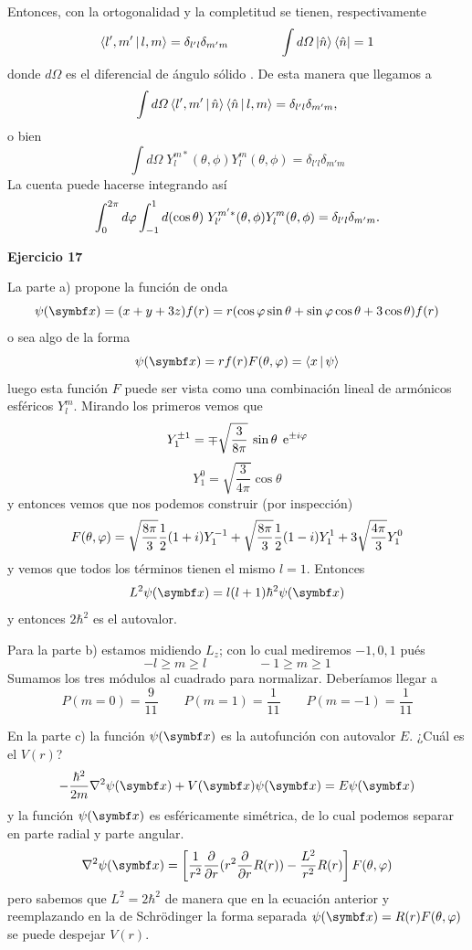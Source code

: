 \documentclass[10pt,oneside]{CBFT_book}
\begin{document}
Entonces, con la ortogonalidad y la completitud se tienen, respectivamente 
\[
	\Braket{l',m'|l,m} = \delta_{l'l} \delta_{m'm}
	\qquad \qquad 
	\int d\Omega \Ket{\hat{n}}\Bra{\hat{n}} = 1
\]
donde $d\Omega$ es el diferencial de ángulo sólido 
. 
De esta manera que llegamos a 
\[
	\int d\Omega \Braket{l',m'|\hat{n}} \Braket{\hat{n}|l,m} = \delta_{l'l} \delta_{m'm},
\]
o bien
\[
	\int d\Omega \; Y_l^{m*}(\theta,\phi)  Y_l^m(\theta,\phi)  = \delta_{l'l} \delta_{m'm}
\]
La cuenta puede hacerse integrando así
\[
	\int_0^{2\pi} d\varphi \int_{-1}^1 d(\cos\theta) \; Y_{l'}^{m'*}(\theta,\phi) 
	Y_l^m(\theta,\phi)  = \delta_{l'l} \delta_{m'm}.
\]

\begin{ejemplo}{\bf Ejercicio 17}

La parte a) propone la función de onda
\[
	\psi(\vbx) = (x+y+3z)f(r) = 
	r (\cos\vp\sin\theta + \sin\vp\cos\theta + 3\cos\theta) f(r)
\]
o sea algo de la forma
\[
	\psi(\vbx) = r f(r) F(\theta,\vp) = \Braket{x|\psi}
\]
luego esta función $F$ puede ser vista como una combinación lineal de armónicos esféricos $Y_l^m$.
Mirando los primeros vemos que
\[
	Y_1^{\pm 1} = \mp \sqrt{\frac{3}{8\pi}} \: \sin\theta \: \:\mathrm{e}^{ \pm i \varphi }
\]
\[
	Y_1^0 = \sqrt{\frac{3}{4\pi}} \cos\theta
\]
y entonces vemos que nos podemos construir (por inspección)
\[
	F(\theta,\varphi) = \sqrt{\frac{8\pi}{3}} \frac{1}{2}(1+i) Y_1^{-1}
	+ \sqrt{\frac{8\pi}{3}} \frac{1}{2}(1-i) Y_1^{1} +
	3 \sqrt{\frac{4\pi}{3}} Y_1^{0}
\]
y vemos que todos los términos tienen el mismo $l=1$. Entonces
\[
	L^2 \psi(\vbx) = l(l+1)\hbar^2\psi(\vbx)
\]
y entonces $2\hbar^2$ es el autovalor.
 
Para la parte b) estamos midiendo $L_z$; con lo cual mediremos $-1,0,1$ pués 
\[
	- l \geq m \geq l 
	\qquad \qquad 
	- 1 \geq m \geq 1
\]
Sumamos los tres módulos al cuadrado para normalizar. Deberíamos llegar a
\[
	P(m=0) = \frac{9}{11} \qquad P(m=1) = \frac{1}{11} \qquad P(m=-1) = \frac{1}{11}
\]
 
En la parte c) la función $\psi(\vbx)$ es la autofunción con autovalor $E$. ¿Cuál es el $V(r)$?
\[
	- \frac{ \hbar^2 }{ 2 m } \nabla^2 \psi(\vbx) + V(\vbx) \psi(\vbx) = E \psi(\vbx)
\]
y la función $\psi(\vbx)$ es esféricamente simétrica, de lo cual podemos separar en parte radial
y parte angular.
\[
	\nabla^2\psi(\vbx) = \left[ \frac{1}{r^2} \dpar{}{r}(r^2 \dpar{}{r}R(r) ) - 
	\frac{L^2}{r^2} R(r) \right] F(\theta,\vp)
\]
pero sabemos que $L^2=2\hbar^2$ de manera que en la ecuación anterior y reemplazando en la de 
Schrödinger la forma separada $\psi(\vbx)=R(r)F(\theta,\vp)$ se puede despejar $V(r)$.
 
\end{ejemplo}
\end{document}
